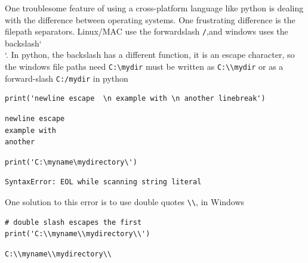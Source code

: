 \documentclass[%
oneside,                 %
final,                   %
10pt]{article}
\begin{document}
One troublesome feature of using a cross-platform language like python is dealing with the difference between operating systems. One frustrating difference is the filepath separators. Linux/MAC use the forwardslash \texttt{/},and windows uses the backslash`\\`. In python, the backslash has a different function, it is an escape character, so the windows file paths need \Verb!C:\mydir! must be written as \Verb!C:\\mydir! or as a forward-slash \texttt{C:/mydir} in python

\begin{Verbatim}[numbers=none,fontsize=\fontsize{9pt}{9pt},baselinestretch=0.95,xleftmargin=2mm]
print('newline escape  \n example with \n another linebreak')
\end{Verbatim}

\begin{Verbatim}[numbers=none,fontsize=\fontsize{9pt}{9pt},baselinestretch=0.95,xleftmargin=2mm]
newline escape
example with
another
\end{Verbatim}

\begin{Verbatim}[numbers=none,fontsize=\fontsize{9pt}{9pt},baselinestretch=0.95,xleftmargin=2mm]
print('C:\myname\mydirectory\')
\end{Verbatim}

\begin{Verbatim}[numbers=none,fontsize=\fontsize{9pt}{9pt},baselinestretch=0.95,xleftmargin=2mm]
SyntaxError: EOL while scanning string literal
\end{Verbatim}

One solution to this error is to use double quotes \Verb!\\!, in Windows
\begin{Verbatim}[numbers=none,fontsize=\fontsize{9pt}{9pt},baselinestretch=0.95,xleftmargin=2mm]
# double slash escapes the first
print('C:\\myname\\mydirectory\\')
\end{Verbatim}

\begin{Verbatim}[numbers=none,fontsize=\fontsize{9pt}{9pt},baselinestretch=0.95,xleftmargin=2mm]
C:\\myname\\mydirectory\\
\end{Verbatim}
\end{document}
